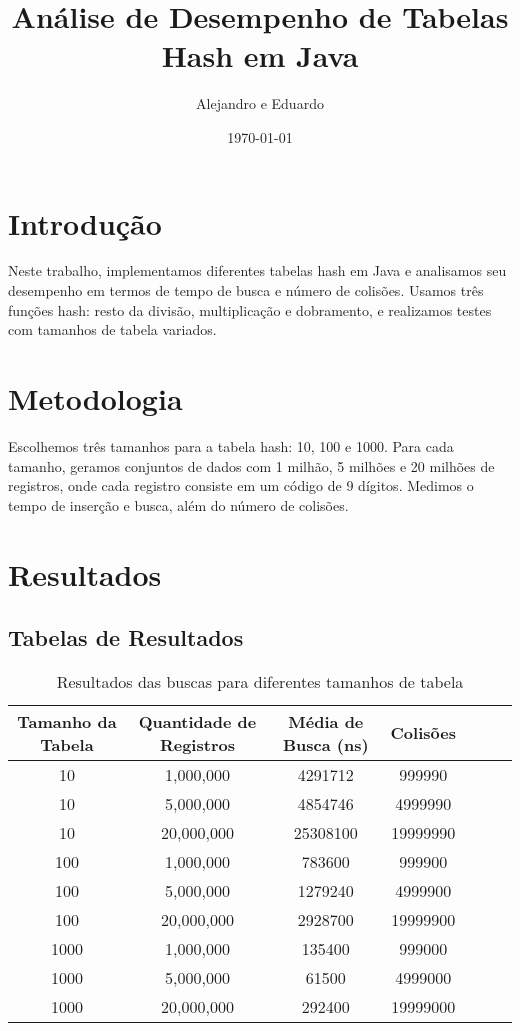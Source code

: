 \documentclass[a4paper,11pt]{article}
\title{Análise de Desempenho de Tabelas Hash em Java}
\author{Alejandro e Eduardo}
\date{\today}
\begin{document}
\maketitle

\section{Introdução}
Neste trabalho, implementamos diferentes tabelas hash em Java e analisamos seu desempenho em termos de tempo de busca e número de colisões. Usamos três funções hash: resto da divisão, multiplicação e dobramento, e realizamos testes com tamanhos de tabela variados.

\section{Metodologia}
Escolhemos três tamanhos para a tabela hash: 10, 100 e 1000. Para cada tamanho, geramos conjuntos de dados com 1 milhão, 5 milhões e 20 milhões de registros, onde cada registro consiste em um código de 9 dígitos. Medimos o tempo de inserção e busca, além do número de colisões.

\section{Resultados}

\subsection{Tabelas de Resultados}

\begin{table}[h]
    \centering
    \caption{Resultados das buscas para diferentes tamanhos de tabela}
    \begin{tabular}{@{}ccccccc@{}}
        \toprule
        Tamanho da Tabela & Quantidade de Registros & Média de Busca (ns) & Colisões \\ \midrule
        10                & 1,000,000              & 4291712              & 999990   \\
        10                & 5,000,000              & 4854746              & 4999990  \\
        10                & 20,000,000             & 25308100             & 19999990 \\
        100               & 1,000,000              & 783600               & 999900   \\
        100               & 5,000,000              & 1279240              & 4999900  \\
        100               & 20,000,000             & 2928700              & 19999900 \\
        1000              & 1,000,000              & 135400               & 999000   \\
        1000              & 5,000,000              & 61500                & 4999000  \\
        1000              & 20,000,000             & 292400               & 19999000 \\ \bottomrule
    \end{tabular}
\end{table}
\end{document}
